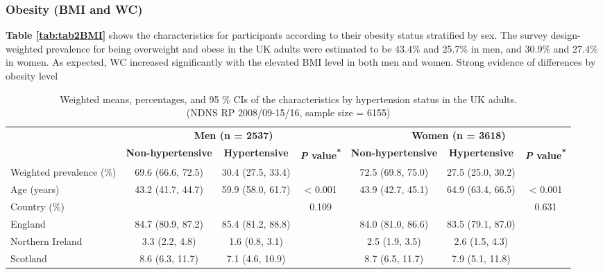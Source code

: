 \subsubsection{Obesity (BMI and WC)}\vspace{-0.3cm}

\textbf{Table \ref{tab:tab2BMI}} shows the characteristics for participants according to their obesity status stratified by sex. The survey design-weighted prevalence for being overweight and obese in the UK adults were estimated to be 43.4\% and 25.7\% in men, and 30.9\% and 27.4\% in women. As expected, WC increased significantly with the elevated BMI level in both men and women. Strong evidence of differences by obesity level

\begin{table}
	\caption{\label{tab:tab1hypetension}Weighted means, percentages, and 95 \% CIs of the characteristics by hypertension status in the UK adults. \\(NDNS RP 2008/09-15/16, sample size = 6155)}
	\centering
	\fontsize{8}{11}\selectfont
	\begin{tabular}[t]{lcccccc}
		\hiderowcolors
		\toprule
		\multicolumn{1}{c}{ } & \multicolumn{3}{c}{\textbf{Men (n = 2537)}} & \multicolumn{3}{c}{\textbf{Women (n = 3618)}} \\
		\cmidrule(l{2pt}r{2pt}){2-4} \cmidrule(l{2pt}r{2pt}){5-7}
		& \textbf{Non-hypertensive} & \textbf{Hypertensive} & \textbf{\textit{P} value\textsuperscript{*}} & \textbf{Non-hypertensive} & \textbf{Hypertensive} & \textbf{\textit{P} value\textsuperscript{*}}\\
		\midrule
		\showrowcolors
		Weighted prevalence (\%) & 69.6 (66.6, 72.5)  & 30.4 (27.5, 33.4) &  & 72.5 (69.8, 75.0) & 27.5 (25.0, 30.2) & \\
		Age (years) & 43.2 (41.7, 44.7) & 59.9 (58.0, 61.7) & < 0.001 & 43.9 (42.7, 45.1) & 64.9 (63.4, 66.5) & < 0.001\\
		Country (\%) &  &  & 0.109 &  &  & 0.631\\
		\hspace{1em}England & 84.7 (80.9, 87.2) & 85.4 (81.2, 88.8) &  & 84.0 (81.0, 86.6) & 83.5 (79.1, 87.0) & \\
		\hspace{1em}Northern Ireland & 3.3 (2.2, 4.8) & 1.6 (0.8, 3.1) &  & 2.5 (1.9, 3.5) & 2.6 (1.5, 4.3) & \\
		\hspace{1em}Scotland & 8.6 (6.3, 11.7) & 7.1 (4.6, 10.9) &  & 8.7 (6.5, 11.7) & 7.9 (5.1, 11.8) & \\

\end{tabular}
\end{table}
